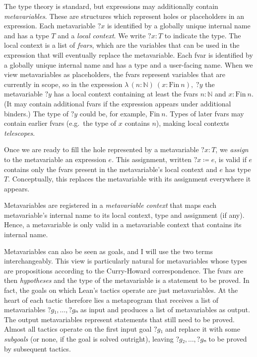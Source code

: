 \documentclass[sigplan,10pt,anonymous,review]{acmart}
\newcommand{\Lam}[2]{λ\,#1,\; #2}
\newcommand{\mvar}[1]{{?#1}}
\begin{document}
The type theory is standard, but expressions may additionally contain \emph{metavariables}.
These are structures which represent holes or placeholders in an expression.
Each metavariable $\mvar{x}$ is identified by a globally unique internal name and has a type $T$ and a \emph{local context}.
We write $\mvar{x} : T$ to indicate the type.
The local context is a list of \emph{fvars}, which are the variables that can be used in the expression that will eventually replace the metavariable.
Each fvar is identified by a globally unique internal name and has a type and a user-facing name.
When we view metavariables as placeholders, the fvars represent variables that are currently in scope, so in the expression $\Lam{(n : ℕ)~(x : \mathrm{Fin}~n)}{\mvar{y}}$ the metavariable $\mvar{y}$ has a local context containing at least the fvars $n : ℕ$ and $x : \mathrm{Fin}~n$.
(It may contain additional fvars if the expression appears under additional binders.)
The type of $\mvar{y}$ could be, for example, $\mathrm{Fin}~n$.
Types of later fvars may contain earlier fvars (e.g.\ the type of $x$ contains $n$), making local contexts \emph{telescopes}.

Once we are ready to fill the hole represented by a metavariable $\mvar{x} : T$, we \emph{assign} to the metavariable an expression $e$.
This assignment, written $\mvar{x} ≔ e$, is valid if $e$ contains only the fvars present in the metavariable's local context and $e$ has type $T$.
Conceptually, this replaces the metavariable with its assignment everywhere it appears.

Metavariables are registered in a \emph{metavariable context} that maps each metavariable's internal name to its local context, type and assignment (if any).
Hence, a metavariable is only valid in a metavariable context that contains its internal name.

Metavariables can also be seen as goals, and I will use the two terms interchangeably.
This view is particularly natural for metavariables whose types are propositions according to the Curry-Howard correspondence.
The fvars are then \emph{hypotheses} and the type of the metavariable is a statement to be proved.
In fact, the goals on which Lean's tactics operate are just metavariables.
At the heart of each tactic therefore lies a metaprogram that receives a list of metavariables $\mvar{g₁}, \dots, \mvar{gₙ}$ as input and produces a list of metavariables as output.
The output metavariables represent statements that still need to be proved.
Almost all tactics operate on the first input goal $\mvar{g₁}$ and replace it with some \emph{subgoals} (or none, if the goal is solved outright), leaving $\mvar{g₂}, \dots, \mvar{gₙ}$ to be proved by subsequent tactics.
\end{document}
